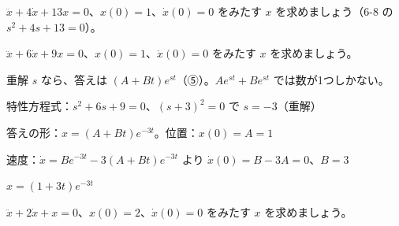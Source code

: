 \begin{jibun}
$\ddot x+4\dot x+13x=0$、$x(0)=1$、$\dot x(0)=0$ をみたす $x$ を求めましょう（6-8 の $s^2+4s+13=0$）。
\end{jibun}


\begin{reidai}[重解のとき]
$\ddot x+6\dot x+9x=0$、$x(0)=1$、$\dot x(0)=0$ をみたす $x$ を求めましょう。\par
\kangaekata 重解 $s$ なら、答えは $(A+Bt)e^{st}$（⑤）。$Ae^{st}+Be^{st}$ では数が1つしかない。\par
\shiki 特性方程式：$s^2+6s+9=0$、$(s+3)^2=0$ で $s=-3$（重解）\par
\bkvimq 答えの形：$x=(A+Bt)e^{-3t}$。位置：$x(0)=A=1$\par
\bkvimq 速度：$\dot x=Be^{-3t}-3(A+Bt)e^{-3t}$ より $\dot x(0)=B-3A=0$、$B=3$\par
\kotae $x=(1+3t)e^{-3t}$
\end{reidai}

\begin{jibun}
$\ddot x+2\dot x+x=0$、$x(0)=2$、$\dot x(0)=0$ をみたす $x$ を求めましょう。
\end{jibun}

